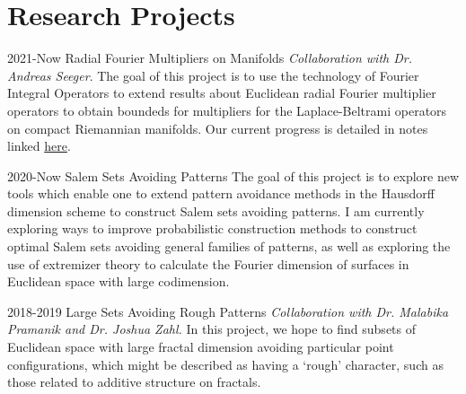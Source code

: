 \documentclass[a4paper]{cv-friggeri}
\begin{document}

\section{Research Projects}

\begin{entrylist}


\entry
{2021-Now}
{Radial Fourier Multipliers on Manifolds}
{}
{\emph{Collaboration with Dr. Andreas Seeger}. The goal of this project is to use the technology of Fourier Integral Operators to extend results about Euclidean radial Fourier multiplier operators to obtain boundeds for multipliers for the Laplace-Beltrami operators on compact Riemannian manifolds. Our current progress is detailed in notes linked \href{https://github.com/jdjake/Notes/blob/master/Research/FourierIntegralOperators/RadialMultipliers.pdf}{here}.}


\entry
{2020-Now}
{Salem Sets Avoiding Patterns}
{}
{The goal of this project is to explore new tools which enable one to extend pattern avoidance methods in the Hausdorff dimension scheme to construct Salem sets avoiding patterns. I am currently exploring ways to improve probabilistic construction methods to construct optimal Salem sets avoiding general families of patterns, as well as exploring the use of extremizer theory to calculate the Fourier dimension of surfaces in Euclidean space with large codimension.}


\entry
{2018-2019}
{Large Sets Avoiding Rough Patterns}
{}
{\emph{Collaboration with Dr. Malabika Pramanik and Dr. Joshua Zahl.} In this project, we hope to find subsets of Euclidean space with large fractal dimension avoiding particular point configurations, which might be described as having a `rough' character, such as those related to additive structure on fractals.}




\end{entrylist}
\end{document}

